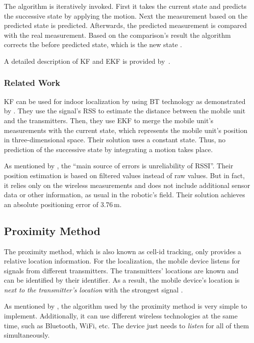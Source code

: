 The algorithm is iteratively invoked. First it takes the current state and predicts the successive state by applying the motion. Next the measurement based on the predicted state is predicted. Afterwards, the predicted measurement is compared with the real measurement. Based on the comparison's result the algorithm corrects the before predicted state, which is the new state \citep{thrun:prob_robo}.

A detailed description of \ac{KF} and \ac{EKF} is provided by~\citet{thrun:prob_robo}.

\subsubsection*{Related Work}
\ac{KF} can be used for indoor localization by using \acl{BT} technology as demonstrated by \citet{kotanen:exp_local_pos_bt}. They use the signal's \ac{RSS} to estimate the distance between the mobile unit and the transmitters.  Then, they use \ac{EKF} to merge the mobile unit's measurements with the current state, which represents the mobile unit's position in three-dimensional space. Their solution uses a constant state. Thus, no prediction of the successive state by integrating a motion takes place.

As mentioned by \citet{kotanen:exp_local_pos_bt}, the ``main source of errors is unreliability of \ac{RSSI}''. Their position estimation is based on filtered values instead of raw values. But in fact, it relies only on the wireless measurements and does not include additional sensor data or other information, as usual in the robotic's field.  Their solution achieves an absolute positioning error of 3.76\,m.


\subsection{Proximity Method}
The proximity method, which is also known as cell-id tracking, only provides a relative location information. For the localization, the mobile device listens for signals from different transmitters. The transmitters' locations are known and can be identified by their identifier. As a result, the mobile device's location is \emph{next to the transmitter's location} with the strongest signal \citep{IEEE:survey_wireless_indoor_pos, wang:bt_pos}.

As mentioned by \citet{IEEE:survey_wireless_indoor_pos}, the algorithm used by the proximity method is very simple to implement. Additionally, it can use different wireless technologies at the same time, such as Bluetooth, WiFi, etc. The device just needs to \emph{listen} for all of them simultaneously. 

